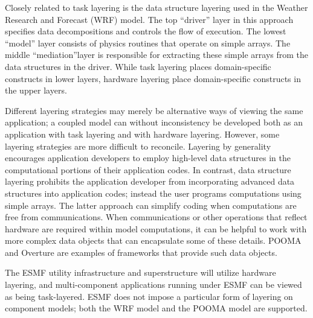 Closely related to task layering is the data structure layering used 
in the Weather Research and Forecast (WRF) model.  The top ``driver'' layer 
in this approach specifies data decompositions and controls
the flow of execution.  The lowest ``model'' layer consists of physics routines that
operate on simple arrays.  The middle ``mediation''layer is responsible for 
extracting these simple arrays from the data structures in the driver.
While task layering places domain-specific constructs in lower layers, hardware 
layering place domain-specific constructs in the upper layers.  

Different layering strategies may merely be alternative ways of viewing the same
application; a coupled model can without inconsistency 
be developed both as an application with task layering and with hardware 
layering.  However, some layering strategies are more difficult to reconcile. 
Layering by generality encourages application developers to employ high-level 
data structures in the computational portions of their application codes.  In 
contrast, data structure layering prohibits the application developer from 
incorporating advanced data structures into application codes; instead the
user
programs computations using simple arrays.  The latter approach can simplify coding
when computations are free from communications.  When communications or other
operations that reflect hardware are required within model computations, it 
can be helpful to work with more complex data objects that can encapsulate some
of these details.  POOMA and Overture are examples of frameworks that 
provide such data objects.

The ESMF utility infrastructure and superstructure will utilize hardware layering, and multi-component applications running under ESMF can be viewed as being task-layered.
ESMF does not impose a particular form of layering on component models; both
the WRF model and the POOMA model are supported.










